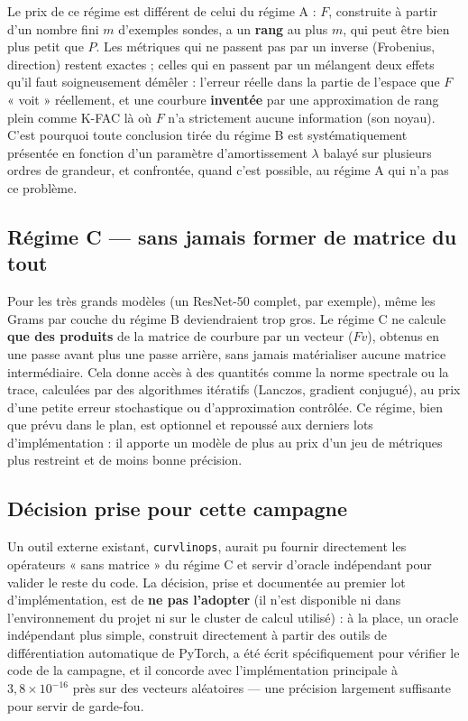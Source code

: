 \documentclass[11pt,a4paper]{article}
\begin{document}
Le prix de ce régime est différent de celui du régime A : $F$, construite à partir d'un nombre fini
$m$ d'exemples sondes, a un \textbf{rang} au plus $m$, qui peut être bien plus petit que $P$. Les
métriques qui ne passent pas par un inverse (Frobenius, direction) restent exactes ; celles qui en
passent par un mélangent deux effets qu'il faut soigneusement démêler : l'erreur réelle dans la
partie de l'espace que $F$ « voit » réellement, et une courbure \textbf{inventée} par une
approximation de rang plein comme K-FAC là où $F$ n'a strictement aucune information (son noyau).
C'est pourquoi toute conclusion tirée du régime B est systématiquement présentée en fonction d'un
paramètre d'amortissement $\lambda$ balayé sur plusieurs ordres de grandeur, et confrontée, quand
c'est possible, au régime A qui n'a pas ce problème.

\subsection{Régime C — sans jamais former de matrice du tout}

Pour les très grands modèles (un ResNet-50 complet, par exemple), même les Grams par couche du
régime B deviendraient trop gros. Le régime C ne calcule \textbf{que des produits} de la matrice de
courbure par un vecteur ($Fv$), obtenus en une passe avant plus une passe arrière, sans jamais
matérialiser aucune matrice intermédiaire. Cela donne accès à des quantités comme la norme spectrale
ou la trace, calculées par des algorithmes itératifs (Lanczos, gradient conjugué), au prix d'une
petite erreur stochastique ou d'approximation contrôlée. Ce régime, bien que prévu dans le plan, est
optionnel et repoussé aux derniers lots d'implémentation : il apporte un modèle de plus au prix
d'un jeu de métriques plus restreint et de moins bonne précision.

\subsection{Décision prise pour cette campagne}

Un outil externe existant, \texttt{curvlinops}, aurait pu fournir directement les opérateurs
« sans matrice » du régime C et servir d'oracle indépendant pour valider le reste du code. La
décision, prise et documentée au premier lot d'implémentation, est de \textbf{ne pas l'adopter}
(il n'est disponible ni dans l'environnement du projet ni sur le cluster de calcul utilisé) : à la
place, un oracle indépendant plus simple, construit directement à partir des outils de
différentiation automatique de PyTorch, a été écrit spécifiquement pour vérifier le code de la
campagne, et il concorde avec l'implémentation principale à $3{,}8\times 10^{-16}$ près sur des
vecteurs aléatoires — une précision largement suffisante pour servir de garde-fou.
\end{document}
